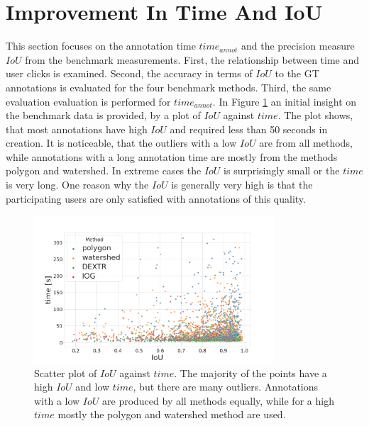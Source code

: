 
\section{Improvement In Time And IoU}\label{ord:ch5:sec1}

This section focuses on the annotation time $time_{annot}$ and the precision measure $IoU$ from the benchmark measurements.
First, the relationship between time and user clicks is examined.
Second, the accuracy in terms of $ IoU $ to the GT annotations is evaluated for the four benchmark methods.
Third, the same evaluation evaluation is performed for $time_{annot}$. 
In Figure \ref{fig:ch5:sec1:iou_vs_time} an initial insight on the benchmark data is provided, by a plot of $ IoU $ against $ time $.
The plot shows, that most annotations have high $ IoU $ and required less than 50 seconds in creation.
It is noticeable, that the outliers with a low $ IoU $ are from all methods, while annotations with a long annotation time  are mostly from the methods polygon and watershed.
In extreme cases the $ IoU $ is surprisingly small or the $ time $ is very long.
One reason why the $ IoU $ is generally very high is that the participating users are only satisfied with annotations of this quality.

\begin{figure}
	\centering
	\includegraphics[width=0.8\textwidth]{figures/chap51_iou_vs_time.png}
	\caption[Scatter plot of $ IoU $ and $ time $]{
		Scatter plot of $ IoU $ against $ time $.
		The majority of the points have a high $ IoU $ and low $ time $, but there are many outliers.
		Annotations with a low $ IoU $ are produced by all methods equally, while for a high $ time $ mostly the polygon and watershed method are used.	
	} \label{fig:ch5:sec1:iou_vs_time}
\end{figure}

